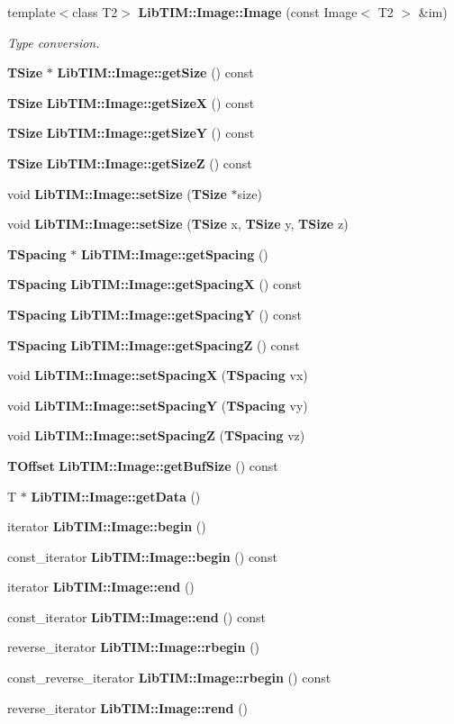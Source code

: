 \begin{CompactItemize}
template$<$class T2$>$ {\bf Lib\-TIM::Image::Image} (const Image$<$ T2 $>$ \&im)
\begin{CompactList}\small\item\em Type conversion. \item\end{CompactList}\item 
{\bf TSize} $\ast$ {\bf Lib\-TIM::Image::get\-Size} () const 
\item 
{\bf TSize} {\bf Lib\-TIM::Image::get\-Size\-X} () const 
\item 
{\bf TSize} {\bf Lib\-TIM::Image::get\-Size\-Y} () const 
\item 
{\bf TSize} {\bf Lib\-TIM::Image::get\-Size\-Z} () const 
\item 
void {\bf Lib\-TIM::Image::set\-Size} ({\bf TSize} $\ast$size)
\item 
void {\bf Lib\-TIM::Image::set\-Size} ({\bf TSize} x, {\bf TSize} y, {\bf TSize} z)
\item 
{\bf TSpacing} $\ast$ {\bf Lib\-TIM::Image::get\-Spacing} ()
\item 
{\bf TSpacing} {\bf Lib\-TIM::Image::get\-Spacing\-X} () const 
\item 
{\bf TSpacing} {\bf Lib\-TIM::Image::get\-Spacing\-Y} () const 
\item 
{\bf TSpacing} {\bf Lib\-TIM::Image::get\-Spacing\-Z} () const 
\item 
void {\bf Lib\-TIM::Image::set\-Spacing\-X} ({\bf TSpacing} vx)
\item 
void {\bf Lib\-TIM::Image::set\-Spacing\-Y} ({\bf TSpacing} vy)
\item 
void {\bf Lib\-TIM::Image::set\-Spacing\-Z} ({\bf TSpacing} vz)
\item 
{\bf TOffset} {\bf Lib\-TIM::Image::get\-Buf\-Size} () const 
\item 
T $\ast$ {\bf Lib\-TIM::Image::get\-Data} ()
\item 
iterator {\bf Lib\-TIM::Image::begin} ()
\item 
const\_\-iterator {\bf Lib\-TIM::Image::begin} () const 
\item 
iterator {\bf Lib\-TIM::Image::end} ()
\item 
const\_\-iterator {\bf Lib\-TIM::Image::end} () const 
\item 
reverse\_\-iterator {\bf Lib\-TIM::Image::rbegin} ()
\item 
const\_\-reverse\_\-iterator {\bf Lib\-TIM::Image::rbegin} () const 
\item 
reverse\_\-iterator {\bf Lib\-TIM::Image::rend} ()

\end{CompactItemize}
